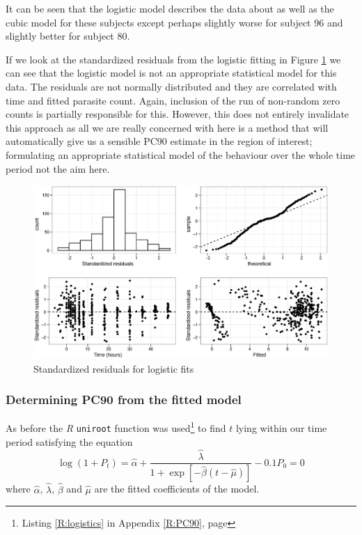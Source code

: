 It can be seen that the logistic model describes the data about as well as the cubic model for these subjects except perhaps slightly worse for subject 96 and slightly better for subject 80.

If we look at the standardized residuals from the logistic fitting in Figure \ref{logisticresid} we can see that the logistic model is not an appropriate statistical model for this data. The residuals are not normally distributed and they are correlated with time and fitted parasite count. Again, inclusion of the run of non-random zero counts is partially responsible for this. However, this does not entirely invalidate this approach as all we are really concerned with here is a method that will automatically give us a sensible PC90 estimate in the region of interest; formulating an appropriate statistical model of the behaviour over the whole time period not the aim here.
\begin{figure}[h]
\includegraphics[width=150mm]{logisticresid.eps} 
\caption{Standardized residuals for logistic fits}\label{logisticresid}
\end{figure}

\subsubsection*{Determining PC90 from the fitted model}
As before the \emph{R} \texttt{uniroot} function was used\footnote{Listing \ref{R:logistics} in Appendix \ref{R:PC90}, page \pageref{R:logistics}} to find $t$ lying within our time period satisfying the equation
$$\log(1+P_t)=\hat{\alpha}+\frac{\hat{\lambda}}{1+\exp[-\hat{\beta}(t-\hat{\mu})]}-0.1{P_{0}}=0$$
where $\hat{\alpha}$, $\hat{\lambda}$, $\hat{\beta}$ and $\hat{\mu}$ are the fitted coefficients of the model.
